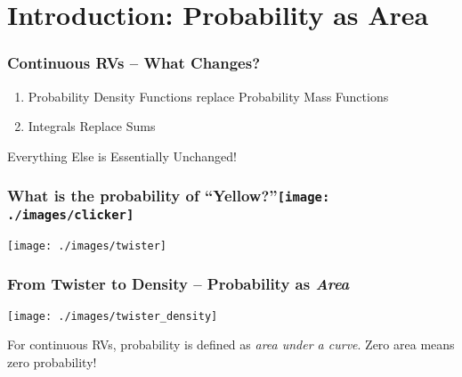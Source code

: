 \section{Introduction: Probability as Area}

\begin{frame}
\frametitle{Continuous RVs -- What Changes?}
	\begin{enumerate}
\item Probability Density Functions replace Probability Mass Functions 
\item Integrals Replace Sums
\end{enumerate}
\begin{alertblock}{Everything Else is Essentially Unchanged!}\end{alertblock}


\end{frame}



\begin{frame}
\frametitle{What is the probability of ``Yellow?''\hfill \texttt{[image: ./images/clicker]}}
\centering
	\texttt{[image: ./images/twister]}

\end{frame}

%
%
%





\begin{frame}
\frametitle{From Twister to Density -- Probability as \emph{Area}}

\centering
	\texttt{[image: ./images/twister\_density]}


\alert{For continuous RVs, probability is defined as \emph{area under a curve}. Zero area means zero probability!}


\end{frame}



